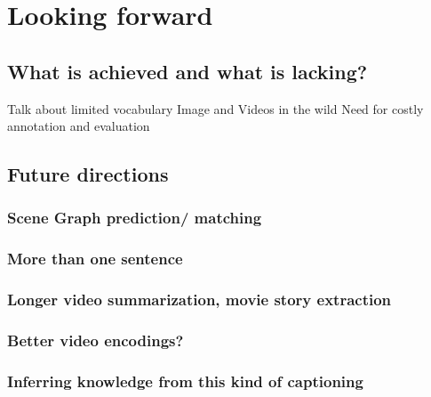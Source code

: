 \chapter{Looking forward}
\label{chapter:discussion}
\section{What is achieved and what is lacking?}
Talk about limited vocabulary
Image and Videos in the wild
Need for costly annotation and evaluation

\section{Future directions}
\subsection{Scene Graph prediction/ matching}
\subsection{More than one sentence}
\subsection{Longer video summarization, movie story extraction}
\subsection{Better video encodings?}
\subsection{Inferring knowledge from this kind of captioning}

